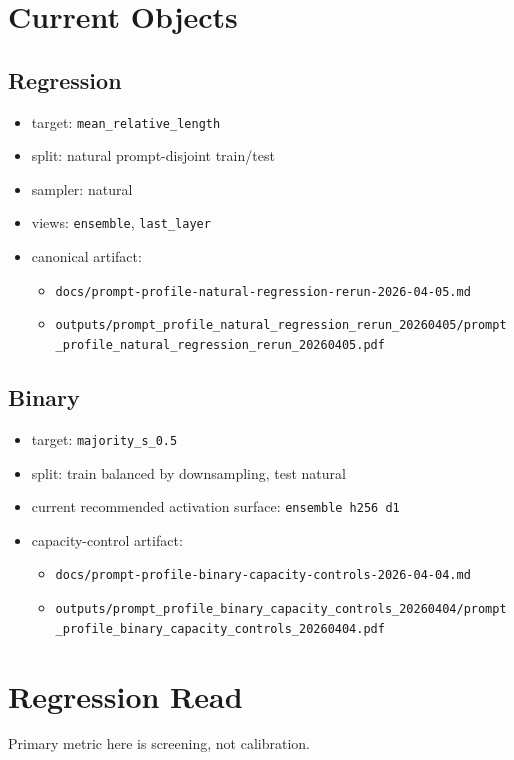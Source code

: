 \documentclass[11pt]{article}
\begin{document}
\section*{Current Objects}
\subsection*{Regression}
\begin{itemize}[leftmargin=1.5em]
\item target: \texttt{mean\_relative\_length}
\item split: natural prompt-disjoint train/test
\item sampler: natural
\item views: \texttt{ensemble}, \texttt{last\_layer}
\item canonical artifact:
  \begin{itemize}[leftmargin=1.5em]
  \item \texttt{docs/prompt-profile-natural-regression-rerun-2026-04-05.md}
  \item \texttt{outputs/prompt\_profile\_natural\_regression\_rerun\_20260405/prompt\_profile\_natural\_regression\_rerun\_20260405.pdf}
  \end{itemize}
\end{itemize}

\subsection*{Binary}
\begin{itemize}[leftmargin=1.5em]
\item target: \texttt{majority\_s\_0.5}
\item split: train balanced by downsampling, test natural
\item current recommended activation surface: \texttt{ensemble h256 d1}
\item capacity-control artifact:
  \begin{itemize}[leftmargin=1.5em]
  \item \texttt{docs/prompt-profile-binary-capacity-controls-2026-04-04.md}
  \item \texttt{outputs/prompt\_profile\_binary\_capacity\_controls\_20260404/prompt\_profile\_binary\_capacity\_controls\_20260404.pdf}
  \end{itemize}
\end{itemize}

\section*{Regression Read}
Primary metric here is screening, not calibration.
\end{document}
